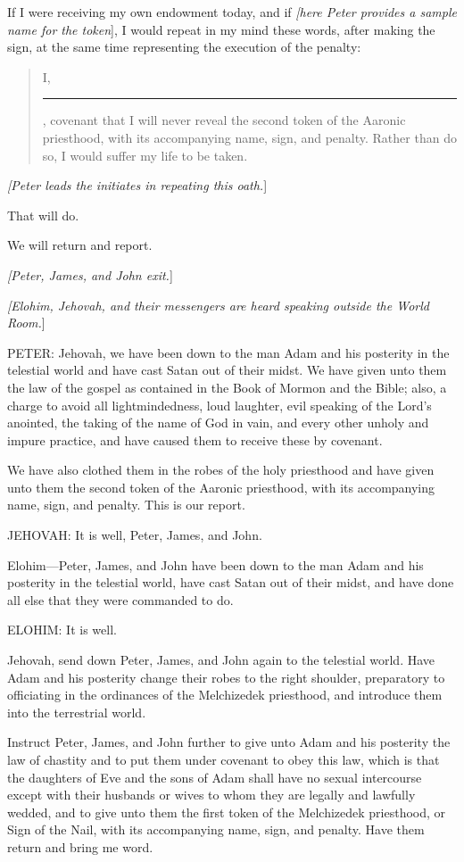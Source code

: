				If I were receiving my own endowment today, and if \textit{[here Peter provides a sample name for the token}], I would repeat in my mind these words, after making the sign, at the same time representing the execution of the penalty:

				\begin{quote}
					I, \rule{1cm}{0.15mm}, covenant that I will never reveal the second token of the Aaronic priesthood, with its accompanying name, sign, and penalty. Rather than do so, I would suffer my life to be taken.
				\end{quote}
				
				\textit{[Peter leads the initiates in repeating this oath.}]

				That will do.

				We will return and report.

				\textit{[Peter, James, and John exit.}]
				
				\textit{[Elohim, Jehovah, and their messengers are heard speaking outside the World Room.}]

				PETER: Jehovah, we have been down to the man Adam and his posterity in the telestial world and have cast Satan out of their midst. We have given unto them the law of the gospel as contained in the Book of Mormon and the Bible; also, a charge to avoid all lightmindedness, loud laughter, evil speaking of the Lord's anointed, the taking of the name of God in vain, and every other unholy and impure practice, and have caused them to receive these by covenant.

				We have also clothed them in the robes of the holy priesthood and have given unto them the second token of the Aaronic priesthood, with its accompanying name, sign, and penalty. This is our report.

				JEHOVAH: It is well, Peter, James, and John.

				Elohim---Peter, James, and John have been down to the man Adam and his posterity in the telestial world, have cast Satan out of their midst, and have done all else that they were commanded to do.

				ELOHIM: It is well.

				Jehovah, send down Peter, James, and John again to the telestial world. Have Adam and his posterity change their robes to the right shoulder, preparatory to officiating in the ordinances of the Melchizedek priesthood, and introduce them into the terrestrial world.

				Instruct Peter, James, and John further to give unto Adam and his posterity the law of chastity and to put them under covenant to obey this law, which is that the daughters of Eve and the sons of Adam shall have no sexual intercourse except with their husbands or wives to whom they are legally and lawfully wedded, and to give unto them the first token of the Melchizedek priesthood, or Sign of the Nail, with its accompanying name, sign, and penalty. Have them return and bring me word.

